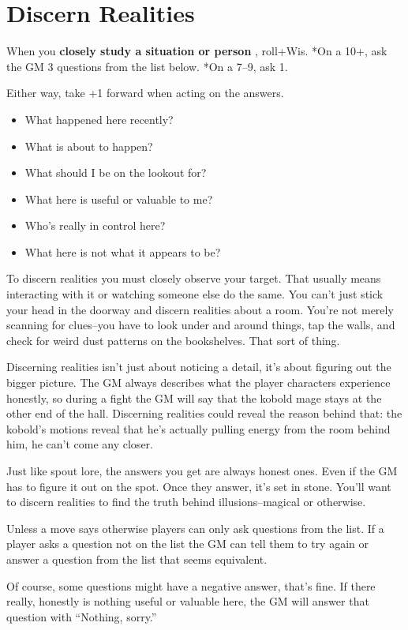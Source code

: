 \section*{Discern Realities}
\HRule
When you \textbf{closely study a situation or person}
, roll+Wis. *On a 10+, ask the GM 3 questions from the list below. *On a 7--9, ask 1.

Either way, take +1 forward when acting on the answers.
\begin{itemize}
\item What happened here recently?
\item What is about to happen?
\item What should I be on the lookout for?
\item What here is useful or valuable to me?
\item Who's really in control here?
\item What here is not what it appears to be?
\end{itemize}
\HRule

To discern realities you must closely observe your target. That usually means interacting with it or watching someone else do the same. You can't just stick your head in the doorway and discern realities about a room. You're not merely scanning for clues--you have to look under and around things, tap the walls, and check for weird dust patterns on the bookshelves. That sort of thing.

Discerning realities isn't just about noticing a detail, it's about figuring out the bigger picture. The GM always describes what the player characters experience honestly, so during a fight the GM will say that the kobold mage stays at the other end of the hall. Discerning realities could reveal the reason behind that: the kobold's motions reveal that he's actually pulling energy from the room behind him, he can't come any closer.

Just like spout lore, the answers you get are always honest ones. Even if the GM has to figure it out on the spot. Once they answer, it's set in stone. You'll want to discern realities to find the truth behind illusions--magical or otherwise.

Unless a move says otherwise players can only ask questions from the list. If a player asks a question not on the list the GM can tell them to try again or answer a question from the list that seems equivalent.

Of course, some questions might have a negative answer, that's fine. If there really, honestly is nothing useful or valuable here, the GM will answer that question with ``Nothing, sorry.''

